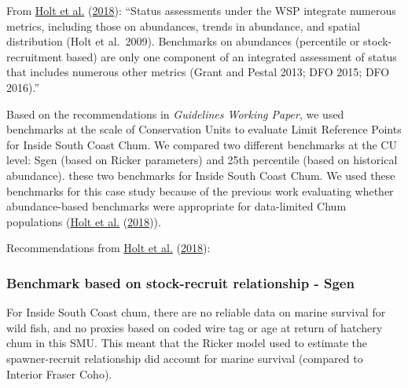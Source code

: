 \documentclass[11pt]{book}
\begin{document}
From \protect\hyperlink{ref-holt_evaluating_2018}{Holt et al.} (\protect\hyperlink{ref-holt_evaluating_2018}{2018}): ``Status assessments under the WSP integrate numerous metrics, including those on abundances, trends in abundance, and spatial distribution (Holt et al.~2009). Benchmarks on abundances (percentile or stock-recruitment based) are only one component of an integrated assessment of status that includes numerous other metrics (Grant and Pestal 2013; DFO 2015; DFO 2016).''

Based on the recommendations in \emph{Guidelines Working Paper}, we used benchmarks at the scale of Conservation Units to evaluate Limit Reference Points for Inside South Coast Chum. We compared two different benchmarks at the CU level: Sgen (based on Ricker parameters) and 25th percentile (based on historical abundance). these two benchmarks for Inside South Coast Chum. We used these benchmarks for this case study because of the previous work evaluating whether abundance-based benchmarks were appropriate for data-limited Chum populations (\protect\hyperlink{ref-holt_evaluating_2018}{Holt et al.} (\protect\hyperlink{ref-holt_evaluating_2018}{2018})).

Recommendations from \protect\hyperlink{ref-holt_evaluating_2018}{Holt et al.} (\protect\hyperlink{ref-holt_evaluating_2018}{2018}):

\hypertarget{benchmark-based-on-stock-recruit-relationship---sgen}{%
\subsubsection{Benchmark based on stock-recruit relationship - Sgen}\label{benchmark-based-on-stock-recruit-relationship---sgen}}

For Inside South Coast chum, there are no reliable data on marine survival for wild fish, and no proxies based on coded wire tag or age at return of hatchery chum in this SMU. This meant that the Ricker model used to estimate the spawner-recruit relationship did account for marine survival (compared to Interior Fraser Coho).
\end{document}
